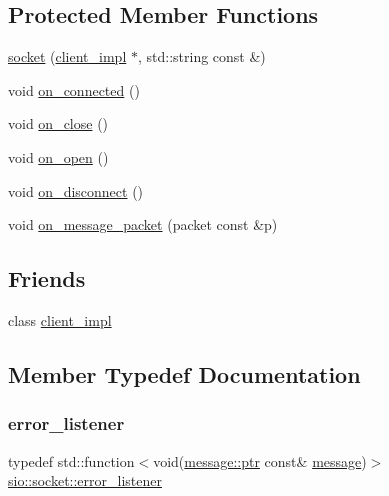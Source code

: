 \subsection*{Protected Member Functions}
\begin{DoxyCompactItemize}
\item 
\hyperlink{classsio_1_1socket_ab4abbc8aa5356f4f48f0b1fa66c08e4b}{socket} (\hyperlink{classsio_1_1socket_a9598885c403f201c146fd19d243051df}{client\+\_\+impl} $\ast$, std\+::string const \&)
\item 
void \hyperlink{classsio_1_1socket_a1c4687fdfc7d6fbbfa98b56ba5aa4030}{on\+\_\+connected} ()
\item 
void \hyperlink{classsio_1_1socket_abf80872f56ac056f3379daf23b31ed23}{on\+\_\+close} ()
\item 
void \hyperlink{classsio_1_1socket_a8a793585b4aeb090bc001036d6786f97}{on\+\_\+open} ()
\item 
void \hyperlink{classsio_1_1socket_a20197f82bb7464e9c530ce27e9f0a01a}{on\+\_\+disconnect} ()
\item 
void \hyperlink{classsio_1_1socket_ac91742e3084791e30551e72e7ba17609}{on\+\_\+message\+\_\+packet} (packet const \&p)
\end{DoxyCompactItemize}
\subsection*{Friends}
\begin{DoxyCompactItemize}
\item 
class \hyperlink{classsio_1_1socket_a9598885c403f201c146fd19d243051df}{client\+\_\+impl}
\end{DoxyCompactItemize}


\subsection{Member Typedef Documentation}
\mbox{\label{classsio_1_1socket_aecfea28271032e09dde1567bbfa97898}} 
\subsubsection{\texorpdfstring{error\+\_\+listener}{error\_listener}}
{\footnotesize\ttfamily typedef std\+::function$<$void(\hyperlink{classsio_1_1message_a6340b6fef57e4516eb17928b1885a615}{message\+::ptr} const\& \hyperlink{classsio_1_1message}{message})$>$ \hyperlink{classsio_1_1socket_aecfea28271032e09dde1567bbfa97898}{sio\+::socket\+::error\+\_\+listener}}

